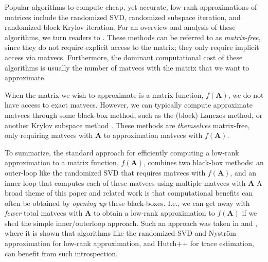 Popular algorithms to compute cheap, yet accurate, low-rank approximations of matrices include the randomized SVD, randomized subspace iteration, and randomized block Krylov iteration. For an overview and analysis of these algorithms, we turn readers to \cite{rsvd,MM15,tropp2023randomized}. These methods can be referred to as \textit{matrix-free}, since they do not require explicit access to the matrix; they only require implicit access via matvecs. Furthermore, the dominant computational cost of these algorithms is usually the number of matvecs with the matrix that we want to approximate. 

When the matrix we wish to approximate is a matrix-function, $f(\bm{A})$, we do not have access to exact matvecs. However, we can typically compute approximate matvecs through some black-box method, such as the (block) Lanczos method, or another Krylov subspace method \cite{blocklanczos,guttel,functionsofmatrices,lanczosfunctionshandbook}. 
These methods are \emph{themselves} matrix-free, only requiring matvecs with $\bm{A}$ to approximation matvecs with $f(\bm{A})$. 

To summarize, the standard approach for efficiently computing a low-rank approximation to a matrix function, $f(\bm{A})$, combines two black-box methods: an outer-loop like the randomized SVD that requires matvecs with $f(\bm{A})$, and an inner-loop that computes each of these matvecs using multiple matvecs with $\bm{A}$ 
%
A broad theme of this paper and related work is that computational benefits can often be obtained by \emph{opening up} these black-boxes. I.e., we can get away with \emph{fewer} total matvecs with $\bm{A}$ to obtain a low-rank approximation to $f(\bm{A})$ if we shed the simple inner/outerloop approach.
Such an approach was taken in \cite{chen_hallman_23} and \cite{persson_kressner_23,funnystrom2}, where it is shown that algorithms like the randomized SVD and Nystr\"om approximation for low-rank approximation, and  Hutch++ for trace estimation, can benefit from such introspection. 


